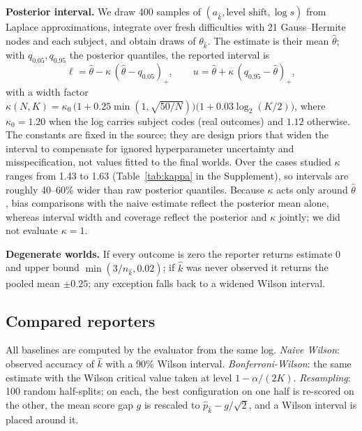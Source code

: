 \documentclass{article}
\begin{document}
\textbf{Posterior interval.} We draw 400 samples of $(a_{\hat k},\text{level shift},\log s)$ from Laplace approximations, integrate over fresh difficulties with 21 Gauss--Hermite nodes and each subject, and obtain draws of $\theta_{\hat k}$. The estimate is their mean $\hat\theta$; with $q_{0.05},q_{0.95}$ the posterior quantiles, the reported interval is
\begin{equation}
\ell=\hat\theta-\kappa\,(\hat\theta-q_{0.05})_+,\qquad u=\hat\theta+\kappa\,(q_{0.95}-\hat\theta)_+ ,
\end{equation}
with a width factor $\kappa(N,K)=\kappa_0\,\big(1+0.25\min(1,\sqrt{50/N})\big)\big(1+0.03\log_2(K/2)\big)$, where $\kappa_0=1.20$ when the log carries subject codes (real outcomes) and $1.12$ otherwise. The constants are fixed in the source; they are design priors that widen the interval to compensate for ignored hyperparameter uncertainty and misspecification, not values fitted to the final worlds. Over the cases studied $\kappa$ ranges from 1.43 to 1.63 (Table~\ref{tab:kappa} in the Supplement), so intervals are roughly 40--60\% wider than raw posterior quantiles. Because $\kappa$ acts only around $\hat\theta$, bias comparisons with the naive estimate reflect the posterior mean alone, whereas interval width and coverage reflect the posterior and $\kappa$ jointly; we did not evaluate $\kappa=1$.

\textbf{Degenerate worlds.} If every outcome is zero the reporter returns estimate $0$ and upper bound $\min(3/n_{\hat k},0.02)$; if $\hat k$ was never observed it returns the pooled mean $\pm0.25$; any exception falls back to a widened Wilson interval.

\subsection{Compared reporters}\label{sec:baselines}
All baselines are computed by the evaluator from the same log. \emph{Naive Wilson}: observed accuracy of $\hat k$ with a 90\% Wilson interval. \emph{Bonferroni-Wilson}: the same estimate with the Wilson critical value taken at level $1-\alpha/(2K)$. \emph{Resampling}: 100 random half-splits; on each, the best configuration on one half is re-scored on the other, the mean score gap $g$ is rescaled to $\hat p_{\hat k}-g/\sqrt2$, and a Wilson interval is placed around it.
\end{document}
